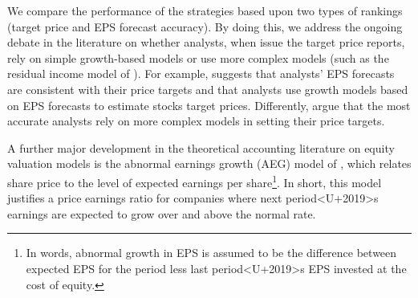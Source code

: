 \documentclass{article}
\newcommand{\tr}{\textit{true}}
\newcommand{\naive}{\textit{recent}}
\newcommand{\default}{\textit{all-time}}
\begin{document}
We compare the performance of the strategies based upon two types of rankings (target price and EPS forecast accuracy). By doing this, we address the ongoing debate in the literature on whether analysts, when issue the target price reports, rely on simple growth-based models or use more complex models (such as the residual income model of \cite{ohlson1995}). For example, \cite{bradshaw2004} suggests that analysts' EPS forecasts are consistent with their price targets and that analysts use growth models based on EPS forecasts to estimate stocks target prices. Differently, \cite{simon2011} argue that the most accurate analysts rely on more complex models in setting their price targets. 

A further major development in the theoretical accounting literature on equity valuation models is the abnormal earnings growth (AEG) model of \cite{ohlson2005}, which relates share price to the level of expected earnings per share\footnote{In words, abnormal growth in EPS is assumed to be the difference between expected EPS for the period less last period<U+2019>s EPS invested at the cost of equity.}. In short, this model justifies a price earnings ratio for companies where next period<U+2019>s earnings are expected to grow over and above the normal rate.







\end{document}
